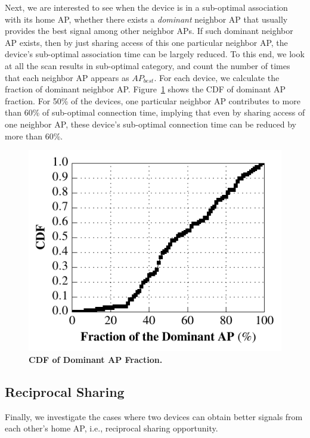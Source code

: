 Next, we are interested to see when the device is in a sub-optimal association
with its home AP, whether there exists a \textit{dominant} neighbor AP that
usually provides the best signal among other neighbor APs. If such dominant
neighbor AP exists, then by just sharing access of this one particular neighbor
AP, the device's sub-optimal association time can be largely reduced. To this
end, we look at all the scan results in sub-optimal category, and count the
number of times that each neighbor AP appears as $AP_{best}$. For each device,
we calculate the fraction of dominant neighbor AP. Figure~\ref{fig:dominantap}
shows the CDF of dominant AP fraction. For 50\% of the devices, one particular
neighbor AP contributes to more than 60\% of sub-optimal connection time,
implying that even by sharing \wifi{} access of one neighbor AP, these device's
sub-optimal connection time can be reduced by more than 60\%.

\begin{figure}[t]
  \centering
  \includegraphics[width=\columnwidth]{./figures/BetterNeighborAPFigure.pdf}
  \caption{\textbf{CDF of Dominant AP Fraction.}}
  \label{fig:dominantap}
\end{figure}


\subsection{Reciprocal Sharing}
\label{subsec:reciprocal}

Finally, we investigate the cases where two devices can obtain better signals
from each other's home AP, i.e., reciprocal sharing opportunity.

